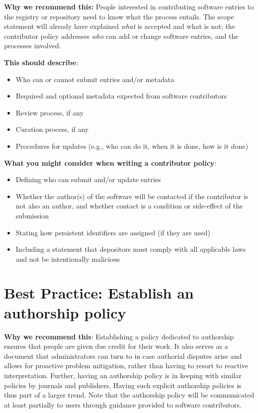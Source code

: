 \documentclass[11pt]{article}
\begin{document}
\textbf{Why we recommend this:} People interested in contributing software entries to the registry or repository need to know what the process entails. The scope statement will already have explained \emph{what} is accepted and what is not; the contributor policy addresses \emph{who} can add or change software entries, and the processes involved.

\textbf{This should describe}:

\begin{itemize}
\item Who can or cannot submit entries and/or metadata

\item Required and optional metadata expected from software contributors

\item Review process, if any

\item Curation process, if any

\item Procedures for updates (e.g., who can do it, when it is done, how is it done)

\end{itemize}

\textbf{What you might consider when writing a contributor policy}:

\begin{itemize}
\item Defining who can submit and/or update entries

\item Whether the author(s) of the software will be contacted if the contributor is not also an author, and whether contact is a condition or side-effect of the submission

\item Stating how persistent identifiers are assigned (if they are used)

\item Including a statement that depositors must comply with all applicable laws and not be intentionally malicious

\end{itemize}


\section{Best Practice: Establish an authorship policy}
\label{best-practice-establish-an-authorship-policy}

\textbf{Why we recommend this}: Establishing a policy dedicated to authorship ensures that people are given due credit for their work. It also serves as a document that administrators can turn to in case authorial disputes arise and allows for proactive problem mitigation, rather than having to resort to reactive interpretation. Further, having an authorship policy is in keeping with similar policies by journals and publishers. Having such explicit authorship policies is thus part of a larger trend. Note that the authorship policy will be communicated at least partially to users through guidance provided to software contributors.
\end{document}
